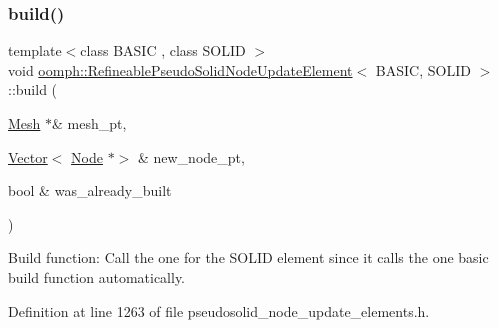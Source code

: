 \subsubsection{\texorpdfstring{build()}{build()}\hspace{0.1cm}{\footnotesize\ttfamily [2/2]}}
{\footnotesize\ttfamily template$<$class B\+A\+S\+IC , class S\+O\+L\+ID $>$ \\
void \hyperlink{classoomph_1_1RefineablePseudoSolidNodeUpdateElement}{oomph\+::\+Refineable\+Pseudo\+Solid\+Node\+Update\+Element}$<$ B\+A\+S\+IC, S\+O\+L\+ID $>$\+::build (\begin{DoxyParamCaption}\item[{\hyperlink{classoomph_1_1Mesh}{Mesh} $\ast$\&}]{mesh\+\_\+pt,  }\item[{\hyperlink{classoomph_1_1Vector}{Vector}$<$ \hyperlink{classoomph_1_1Node}{Node} $\ast$$>$ \&}]{new\+\_\+node\+\_\+pt,  }\item[{bool \&}]{was\+\_\+already\+\_\+built }\end{DoxyParamCaption})\hspace{0.3cm}{\ttfamily [inline]}}



Build function\+: Call the one for the S\+O\+L\+ID element since it calls the one basic build function automatically. 



Definition at line 1263 of file pseudosolid\+\_\+node\+\_\+update\+\_\+elements.\+h.

\mbox{\label{classoomph_1_1RefineablePseudoSolidNodeUpdateElement_a566d35b215a97e63ce6ebba0e94631b9}} 
